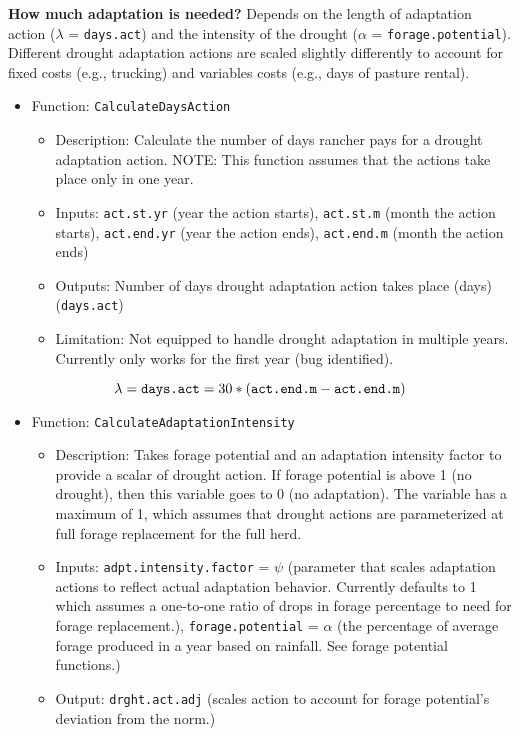 \documentclass[11pt]{article}
\begin{document}
\textbf{How much adaptation is needed?} Depends on the length of adaptation action ($\lambda$ = \verb!days.act!) and the intensity of the drought ($\alpha$ = \verb!forage.potential!). Different drought adaptation actions are scaled slightly differently to account for fixed costs (e.g., trucking) and variables costs (e.g., days of pasture rental). 

\begin{itemize}
\item Function: \verb!CalculateDaysAction!
	\begin{itemize}
	\item Description: Calculate the number of days rancher pays for a drought adaptation action. NOTE: This function assumes that the actions take place only in one year.
	\item Inputs: \verb!act.st.yr! (year the action starts), \verb!act.st.m! (month the action starts), \verb!act.end.yr! (year the action ends), \verb!act.end.m! (month the action ends)
	\item Outputs: Number of days drought adaptation action takes place (days) (\verb!days.act!)
	\item Limitation: Not equipped to handle drought adaptation in multiple years. Currently only works for the first year (bug identified).
	\end{itemize}
\end{itemize}

\begin{equation} \label{days}
\lambda = \verb!days.act! = 30 * (\verb!act.end.m! - \verb!act.end.m!)
\end{equation}

\begin{itemize}
\item Function: \verb!CalculateAdaptationIntensity!
	\begin{itemize}
	\item Description: Takes forage potential and an adaptation intensity factor to provide a scalar of drought action. If forage potential is above 1 (no drought), then this variable goes to 0 (no adaptation). The variable has a maximum of 1, which assumes that drought actions are parameterized at full forage replacement for the full herd.
	\item Inputs: \verb!adpt.intensity.factor! = \(\psi\) (parameter that scales adaptation actions to reflect actual adaptation behavior. Currently defaults to 1 which assumes a one-to-one ratio of drops in forage percentage to need for forage replacement.), \verb!forage.potential! = \(\alpha\) (the percentage of average forage produced in a year based on rainfall. See forage potential functions.)
	\item Output: \verb!drght.act.adj! (scales action to account for forage potential's deviation from the norm.)
	\end{itemize}
\end{itemize}
\end{document}
